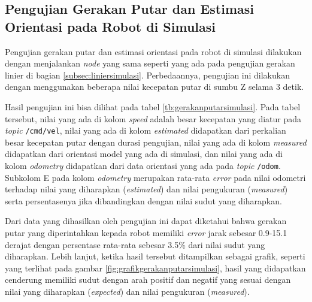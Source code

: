 \subsection{Pengujian Gerakan Putar dan Estimasi Orientasi pada Robot di Simulasi}
\label{subsec:putarsimulasi}

Pengujian gerakan putar dan estimasi orientasi pada robot di simulasi dilakukan dengan menjalankan \emph{node} yang sama seperti yang ada pada pengujian gerakan linier di bagian \ref{subsec:liniersimulasi}.
Perbedaannya, pengujian ini dilakukan dengan menggunakan beberapa nilai kecepatan putar di sumbu Z selama 3 detik.



Hasil pengujian ini bisa dilihat pada tabel \ref{tb:gerakanputarsimulasi}.
Pada tabel tersebut, nilai yang ada di kolom \emph{speed} adalah besar kecepatan yang diatur pada \emph{topic} \lstinline{/cmd/vel},
  nilai yang ada di kolom \emph{estimated} didapatkan dari perkalian besar kecepatan putar dengan durasi pengujian,
  nilai yang ada di kolom \emph{measured} didapatkan dari orientasi model yang ada di simulasi,
  dan nilai yang ada di kolom \emph{odometry} didapatkan dari data orientasi yang ada pada \emph{topic} \lstinline{/odom}.
Subkolom E pada kolom \emph{odometry} merupakan rata-rata \emph{error} pada nilai odometri terhadap nilai yang diharapkan (\emph{estimated}) dan nilai pengukuran (\emph{measured}) serta persentasenya jika dibandingkan dengan nilai sudut yang diharapkan.



Dari data yang dihasilkan oleh pengujian ini dapat diketahui bahwa gerakan putar yang diperintahkan kepada robot memiliki \emph{error} jarak sebesar 0.9-15.1 derajat dengan persentase rata-rata sebesar 3.5\% dari nilai sudut yang diharapkan.
Lebih lanjut, ketika hasil tersebut ditampilkan sebagai grafik,
  seperti yang terlihat pada gambar \ref{fig:grafikgerakanputarsimulasi},
  hasil yang didapatkan cenderung memiliki sudut dengan arah positif dan negatif yang sesuai dengan nilai yang diharapkan (\emph{expected}) dan nilai pengukuran (\emph{measured}).
